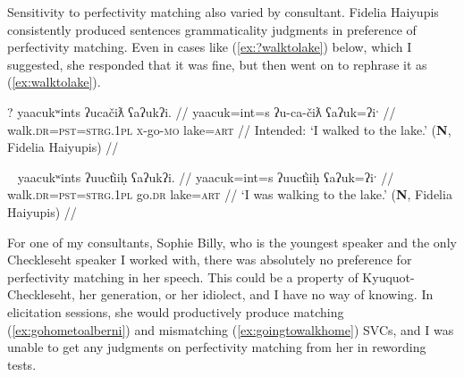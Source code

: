 \begin{comment}
(\ref{ex:drivehome}) and (\ref{ex:*drivehome}) show the same pattern and were elicited in the same way	. In (\ref{ex:drivehome}), the first verb \textit{ƛiḥaa} is in the continuative aspect, which is imperfective, and the second verb \textit{waałšiƛ} is in graduative, which is also imperfective. In (\ref{ex:*drivehome}), the same two verb roots are used, but instead of imperfective, graduative \textit{waałšiƛ}, there is momentaneous, perfective \textit{wałšiƛ}. This aspectual mismatch causes (\ref{ex:*drivehome}) to be ungrammatical.

\ex \label{ex:drivehome}
\begingl
\glpreamble ƛiḥaamitniš siy̓a łuučm̓uupukqs waałšiƛ. //
\gla ƛiḥ-(y)aˑ=(m)it=niˑš siy̓a łuučm̓uup=uk=qs wał-šiƛ-LS //
\glb drive-\textsc{cv}=\textsc{pst}=\textsc{strg.1pl} \textsc{1sg} sister=\textsc{poss}=\textsc{defn.1sg} go.home-\textsc{mo}-\textsc{gr} //
\glft `We were driving home in the car.' (\textbf{C}, \textit{tupaat} Julia Lucas) //
\endgl
\xe

\ex~ \label{ex:*drivehome}
\begingl
\glpreamble *wałšiƛw̓it̓asniš ƛiḥaa. //
\gla wał-šiƛ-w̓it̓as=niˑš ƛiḥ-(y)aˑ //
\glb go.home-\textsc{mo}-going.to=\textsc{strg.1pl} drive-\textsc{cv} //
\glft Intended: `We will drive home.' (\textbf{C}, \textit{tupaat} Julia Lucas) //
\endgl
\xe
\end{comment}

Sensitivity to perfectivity matching also varied by consultant. Fidelia Haiyupis consistently produced sentences grammaticality judgments in preference of perfectivity matching. Even in cases like (\ref{ex:?walktolake}) below, which I suggested, she responded that it was fine, but then went on to rephrase it as (\ref{ex:walktolake}).

\ex \label{ex:?walktolake}
\begingl
\glpreamble ? yaacukʷints ʔucačiƛ ʕaʔukʔi. //
\gla yaacuk=int=s ʔu-ca-čiƛ ʕaʔuk=ʔiˑ //
\glb walk.\textsc{dr}=\textsc{pst}=\textsc{strg.1pl} \textsc{x}-go-\textsc{mo} lake=\textsc{art} //
\glft Intended: `I walked to the lake.' (\textbf{N}, Fidelia Haiyupis) //
\endgl
\xe

\ex~ \label{ex:walktolake}
\begingl
\glpreamble yaacukʷints ʔuuct̓iiḥ ʕaʔukʔi. //
\gla yaacuk=int=s ʔuuct̓iiḥ ʕaʔuk=ʔiˑ //
\glb walk.\textsc{dr}=\textsc{pst}=\textsc{strg.1pl} go.\textsc{dr} lake=\textsc{art} //
\glft `I was walking to the lake.' (\textbf{N}, Fidelia Haiyupis) //
\endgl
\xe

For one of my consultants, Sophie Billy, who is the youngest speaker and the only Checkleseht speaker I worked with, there was absolutely no preference for perfectivity matching in her speech. This could be a property of Kyuquot-Checkleseht, her generation, or her idiolect, and I have no way of knowing. In elicitation sessions, she would productively produce matching (\ref{ex:gohometoalberni}) and mismatching (\ref{ex:goingtowalkhome}) SVCs, and I was unable to get any judgments on perfectivity matching from her in rewording tests.

